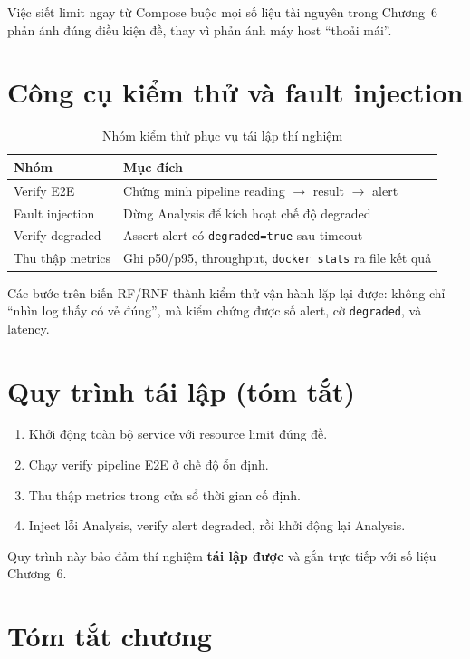 \documentclass[12pt,a4paper,oneside]{report}
\newcommand{\code}[1]{\texttt{#1}}
\begin{document}
Việc siết limit ngay từ Compose buộc mọi số liệu tài nguyên trong Chương~6 phản ánh đúng điều kiện đề, thay vì phản ánh máy host ``thoải mái''.

\section{Công cụ kiểm thử và fault injection}

\begin{table}[htbp]
  \centering
  \caption{Nhóm kiểm thử phục vụ tái lập thí nghiệm}
  \label{tab:scripts}
  \begin{tabular}{p{5.0cm}p{8.0cm}}
    \toprule
    \textbf{Nhóm} & \textbf{Mục đích} \\
    \midrule
    Verify E2E & Chứng minh pipeline reading $\rightarrow$ result $\rightarrow$ alert \\
    Fault injection & Dừng Analysis để kích hoạt chế độ degraded \\
    Verify degraded & Assert alert có \code{degraded=true} sau timeout \\
    Thu thập metrics & Ghi p50/p95, throughput, \code{docker stats} ra file kết quả \\
    \bottomrule
  \end{tabular}
\end{table}

Các bước trên biến RF/RNF thành kiểm thử vận hành lặp lại được: không chỉ ``nhìn log thấy có vẻ đúng'', mà kiểm chứng được số alert, cờ \code{degraded}, và latency.

\section{Quy trình tái lập (tóm tắt)}

\begin{enumerate}
  \item Khởi động toàn bộ service với resource limit đúng đề.
  \item Chạy verify pipeline E2E ở chế độ ổn định.
  \item Thu thập metrics trong cửa sổ thời gian cố định.
  \item Inject lỗi Analysis, verify alert degraded, rồi khởi động lại Analysis.
\end{enumerate}
Quy trình này bảo đảm thí nghiệm \textbf{tái lập được} và gắn trực tiếp với số liệu Chương~6.

\section{Tóm tắt chương}
\end{document}

